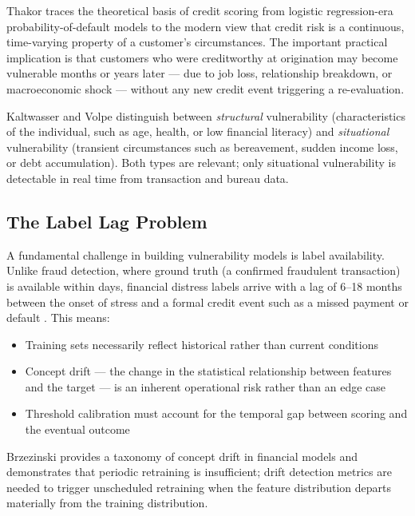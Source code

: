 \documentclass[12pt, a4paper]{article}
\begin{document}
Thakor \cite{thakor2020} traces the theoretical basis of credit scoring from
logistic regression-era probability-of-default models to the modern view that
credit risk is a continuous, time-varying property of a customer's circumstances.
The important practical implication is that customers who were creditworthy at
origination may become vulnerable months or years later --- due to job loss,
relationship breakdown, or macroeconomic shock --- without any new credit event
triggering a re-evaluation.

Kaltwasser and Volpe \cite{kaltwasser2018} distinguish between \emph{structural}
vulnerability (characteristics of the individual, such as age, health, or low
financial literacy) and \emph{situational} vulnerability (transient circumstances
such as bereavement, sudden income loss, or debt accumulation).
Both types are relevant; only situational vulnerability is detectable in real time
from transaction and bureau data.

\subsection{The Label Lag Problem}

A fundamental challenge in building vulnerability models is label availability.
Unlike fraud detection, where ground truth (a confirmed fraudulent transaction) is
available within days, financial distress labels arrive with a lag of 6--18 months
between the onset of stress and a formal credit event such as a missed payment or
default \cite{lessmann2015}.
This means:

\begin{itemize}[itemsep=2pt]
    \item Training sets necessarily reflect historical rather than current conditions
    \item Concept drift --- the change in the statistical relationship between features
          and the target --- is an inherent operational risk rather than an edge case
    \item Threshold calibration must account for the temporal gap between scoring
          and the eventual outcome
\end{itemize}

Brzezinski \cite{brzezinski2014} provides a taxonomy of concept drift in financial
models and demonstrates that periodic retraining is insufficient; drift detection
metrics are needed to trigger unscheduled retraining when the feature distribution
departs materially from the training distribution.
\end{document}
